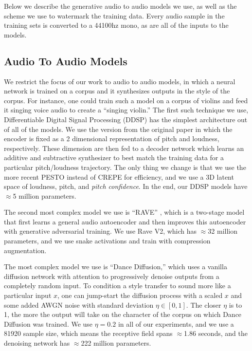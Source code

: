 \documentclass[letterpaper]{article} %
\begin{document}
Below we describe the generative audio to audio models we use, as well as the scheme we use to watermark the training data. Every audio sample in the training sets is converted to a 44100hz mono, as are all of the inputs to the models.

\subsection{Audio To Audio Models}

We restrict the focus of our work to audio to audio models, in which a neural network is trained on a corpus and it synthesizes outputs in the style of the corpus.  For instance, one could train such a model on a corpus of violins and feed it singing voice audio to create a ``singing violin.''  The first such technique we use, Differentiable Digital Signal Processing (DDSP) \cite{engelddsp} has the simplest architecture out of all of the models.  We use the version from the original paper in which the encoder is fixed as a 2 dimensional representation of pitch and loudness, respectively.  These dimension are then fed to a decoder network which learns an additive and subtractive synthesizer to best match the training data for a particular pitch/loudness trajectory.  The only thing we change is that we use the more recent PESTO \cite{riou2023pesto} instead of CREPE \cite{kim2018crepe} for efficiency, and we use a 3D latent space of loudness, pitch, and {\em pitch confidence}.  In the end, our DDSP models have $\approx$5 million parameters.


The second most complex model we use is ``RAVE'' \cite{caillon2021rave}, which is a two-stage model that first learns a general audio autoencoder and then improves this autoencoder with generative adversarial training.  We use Rave V2, which has $\approx$32 million parameters, and we use snake activations and train with compression augmentation. 

The most complex model we use is ``Dance Diffusion,'' which uses a vanilla diffusion network \cite{sohl2015deep} with attention to progressively denoise outputs from a completely random input.  To condition a style transfer to sound more like a particular input $x$, one can jump-start the diffusion process with a scaled $x$ and some added AWGN noise with standard deviation $\eta \in [0, 1]$.  The closer $\eta$ is to 1, the more the output will take on the character of the corpus on which Dance Diffusion was trained.  We use $\eta=0.2$ in all of our experiments, and we use a 81920 sample size, which means the receptive field spans $\approx$1.86 seconds, and the denoising network has $\approx$222 million parameters.%
\end{document}
